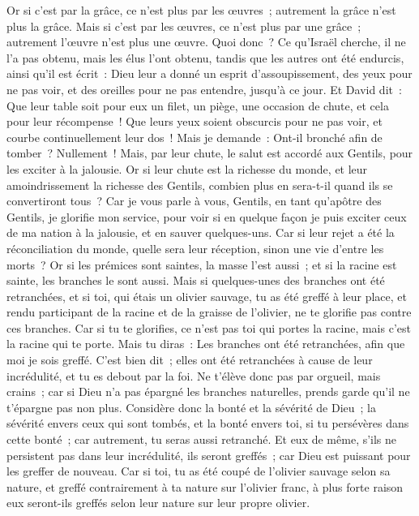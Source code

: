\begin{multicols}{2}
Or si c'est par la grâce, ce n'est plus par les œuvres~; autrement la grâce n'est plus la grâce. Mais si c'est par les œuvres, ce n'est plus par une grâce~; autrement l'œuvre n'est plus une œuvre.
Quoi donc~? Ce qu'Israël cherche, il ne l'a pas obtenu, mais les élus l'ont obtenu, tandis que les autres ont été endurcis,
ainsi qu'il est écrit~: Dieu leur a donné un esprit d'assoupissement, des yeux pour ne pas voir, et des oreilles pour ne pas entendre, jusqu'à ce jour. Et David dit~:
Que leur table soit pour eux un filet, un piège, une occasion de chute, et cela pour leur récompense~!
Que leurs yeux soient obscurcis pour ne pas voir, et courbe continuellement leur dos~!
Mais je demande~: Ont-il bronché afin de tomber~? Nullement~! Mais, par leur chute, le salut est accordé aux Gentils, pour les exciter à la jalousie.
Or si leur chute est la richesse du monde, et leur amoindrissement la richesse des Gentils, combien plus en sera-t-il quand ils se convertiront tous~?
Car je vous parle à vous, Gentils, en tant qu'apôtre des Gentils, je glorifie mon service,
pour voir si en quelque façon je puis exciter ceux de ma nation à la jalousie, et en sauver quelques-uns.
Car si leur rejet a été la réconciliation du monde, quelle sera leur réception, sinon une vie d'entre les morts~?
Or si les prémices sont saintes, la masse l'est aussi~; et si la racine est sainte, les branches le sont aussi.
Mais si quelques-unes des branches ont été retranchées, et si toi, qui étais un olivier sauvage, tu as été greffé à leur place, et rendu participant de la racine et de la graisse de l'olivier,
ne te glorifie pas contre ces branches. Car si tu te glorifies, ce n'est pas toi qui portes la racine, mais c'est la racine qui te porte.
Mais tu diras~: Les branches ont été retranchées, afin que moi je sois greffé.
C'est bien dit~; elles ont été retranchées à cause de leur incrédulité, et tu es debout par la foi. Ne t'élève donc pas par orgueil, mais crains~;
car si Dieu n'a pas épargné les branches naturelles, prends garde qu'il ne t'épargne pas non plus.
Considère donc la bonté et la sévérité de Dieu~; la sévérité envers ceux qui sont tombés, et la bonté envers toi, si tu persévères dans cette bonté~; car autrement, tu seras aussi retranché.
Et eux de même, s'ils ne persistent pas dans leur incrédulité, ils seront greffés~; car Dieu est puissant pour les greffer de nouveau.
Car si toi, tu as été coupé de l'olivier sauvage selon sa nature, et greffé contrairement à ta nature sur l'olivier franc, à plus forte raison eux seront-ils greffés selon leur nature sur leur propre olivier.

\end{multicols}
